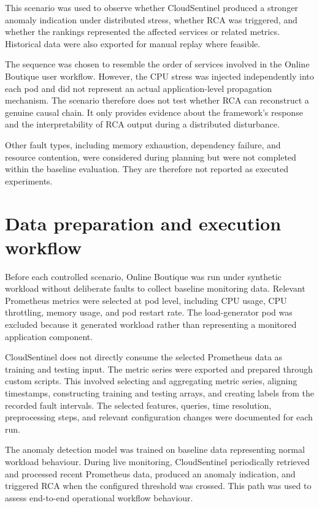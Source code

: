 This scenario was used to observe whether CloudSentinel produced a stronger anomaly indication under distributed stress, whether RCA was triggered, and whether the rankings represented the affected services or related metrics. Historical data were also exported for manual replay where feasible.

The sequence was chosen to resemble the order of services involved in the Online Boutique user workflow. However, the CPU stress was injected independently into each pod and did not represent an actual application-level propagation mechanism. The scenario therefore does not test whether RCA can reconstruct a genuine causal chain. It only provides evidence about the framework's response and the interpretability of RCA output during a distributed disturbance.

Other fault types, including memory exhaustion, dependency failure, and resource contention, were considered during planning but were not completed within the baseline evaluation. They are therefore not reported as executed experiments.

\section{Data preparation and execution workflow}
Before each controlled scenario, Online Boutique was run under synthetic workload without deliberate faults to collect baseline monitoring data. Relevant Prometheus metrics were selected at pod level, including CPU usage, CPU throttling, memory usage, and pod restart rate. The load-generator pod was excluded because it generated workload rather than representing a monitored application component.

CloudSentinel does not directly consume the selected Prometheus data as training and testing input. The metric series were exported and prepared through custom scripts. This involved selecting and aggregating metric series, aligning timestamps, constructing training and testing arrays, and creating labels from the recorded fault intervals. The selected features, queries, time resolution, preprocessing steps, and relevant configuration changes were documented for each run.

The anomaly detection model was trained on baseline data representing normal workload behaviour. During live monitoring, CloudSentinel periodically retrieved and processed recent Prometheus data, produced an anomaly indication, and triggered RCA when the configured threshold was crossed. This path was used to assess end-to-end operational workflow behaviour.


